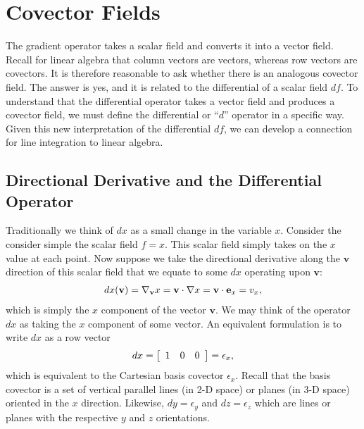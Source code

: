 \section{Covector Fields}

The gradient operator takes a scalar field and converts it into a vector field. Recall for linear algebra that column vectors are vectors, whereas row vectors are covectors. It is therefore reasonable to ask whether there is an analogous covector field. The answer is yes, and it is related to the differential of a scalar field $df$. To understand that the differential operator takes a vector field and produces a covector field, we must define the differential or ``$d$'' operator in a specific way. Given this new interpretation of the differential $df$, we can develop a connection for line integration to linear algebra.

\subsection{Directional Derivative and the Differential Operator}

Traditionally we think of $dx$ as a small change in the variable $x$. Consider the consider simple the scalar field $f = x$. This scalar field simply takes on the $x$ value at each point. Now suppose we take the directional derivative along the $\mathbf{v}$ direction of this scalar field that we equate to some $dx$ operating upon $\mathbf{v}$:
\begin{align}
  dx( \mathbf{v} ) = \nabla_{\mathbf{v}} x = \mathbf{v} \cdot \nabla x = \mathbf{v} \cdot \mathbf{e}_x = v_x,
\end{align}
which is simply the $x$ component of the vector $\mathbf{v}$. We may think of the operator $dx$ as taking the $x$ component of some vector. An equivalent formulation is to write $dx$ as a row vector
\begin{align}
  dx = \left[ \begin{array}{c c c} 1 & 0 & 0 \\ \end{array} \right] = \epsilon_x,
\end{align}
which is equivalent to the Cartesian basis covector $\epsilon_x$. Recall that the basis covector is a set of vertical parallel lines (in 2-D space) or planes (in 3-D space) oriented in the $x$ direction. Likewise, $dy = \epsilon_y$ and $dz = \epsilon_z$ which are lines or planes with the respective $y$ and $z$ orientations.


